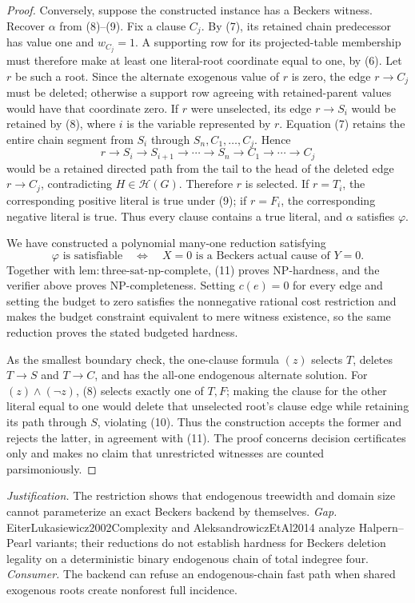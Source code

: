\documentclass{article}
\begin{document}
\begin{proof}
Conversely, suppose the constructed instance has a Beckers witness.  Recover \(\alpha\) from (8)--(9).  Fix a clause \(C_j\).  By (7), its retained chain predecessor has value one and \(w_{C_j}=1\).  A supporting row for its projected-table membership must therefore make at least one literal-root coordinate equal to one, by (6).  Let \(r\) be such a root.  Since the alternate exogenous value of \(r\) is zero, the edge \(r\to C_j\) must be deleted; otherwise a support row agreeing with retained-parent values would have that coordinate zero.  If \(r\) were unselected, its edge \(r\to S_i\) would be retained by (8), where \(i\) is the variable represented by \(r\).  Equation (7) retains the entire chain segment from \(S_i\) through \(S_n,C_1,\ldots,C_j\).  Hence
\[
 r\to S_i\to S_{i+1}\to\cdots\to S_n\to C_1\to\cdots\to C_j                    \tag{10}
\]
would be a retained directed path from the tail to the head of the deleted edge \(r\to C_j\), contradicting \(H\in\mathcal H(G)\).  Therefore \(r\) is selected.  If \(r=T_i\), the corresponding positive literal is true under (9); if \(r=F_i\), the corresponding negative literal is true.  Thus every clause contains a true literal, and \(\alpha\) satisfies \(\varphi\).

We have constructed a polynomial many-one reduction satisfying
\[
 \varphi\text{ is satisfiable}
 \quad\Longleftrightarrow\quad
 X=0\text{ is a Beckers actual cause of }Y=0.                                      \tag{11}
\]
Together with \(\mathrm{lem:three\mbox{-}sat\mbox{-}np\mbox{-}complete}\), (11) proves \(\mathrm{NP}\)-hardness, and the verifier above proves \(\mathrm{NP}\)-completeness.  Setting \(c(e)=0\) for every edge and setting the budget to zero satisfies the nonnegative rational cost restriction and makes the budget constraint equivalent to mere witness existence, so the same reduction proves the stated budgeted hardness.

As the smallest boundary check, the one-clause formula \((z)\) selects \(T\), deletes \(T\to S\) and \(T\to C\), and has the all-one endogenous alternate solution.  For \((z)\wedge(\neg z)\), (8) selects exactly one of \(T,F\); making the clause for the other literal equal to one would delete that unselected root's clause edge while retaining its path through \(S\), violating (10).  Thus the construction accepts the former and rejects the latter, in agreement with (11).  The proof concerns decision certificates only and makes no claim that unrestricted witnesses are counted parsimoniously.
\end{proof}
\par\smallskip\noindent \textit{Justification.} The restriction shows that endogenous treewidth and domain size cannot parameterize an exact Beckers backend by themselves. \textit{Gap.} EiterLukasiewicz2002Complexity and AleksandrowiczEtAl2014 analyze Halpern--Pearl variants; their reductions do not establish hardness for Beckers deletion legality on a deterministic binary endogenous chain of total indegree four. \textit{Consumer.} The backend can refuse an endogenous-chain fast path when shared exogenous roots create nonforest full incidence.
\end{document}
